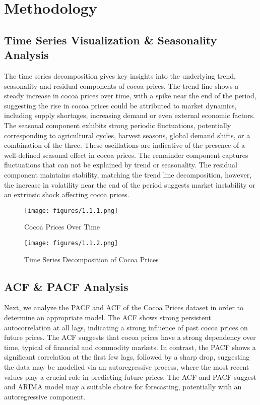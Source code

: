 
\chapter{Methodology}

    
\section{Time Series Visualization \& Seasonality Analysis}
The time series decomposition gives key insights into the underlying trend, seasonality and residual components of cocoa prices. The trend line shows a steady increase in cocoa prices over time, with a spike near the end of the period, suggesting the rise in cocoa prices could be attributed to market dynamics, including supply shortages, increasing demand or even external economic factors. The seasonal component exhibits strong periodic fluctuations, potentially corresponding to agricultural cycles, harvest seasons, global demand shifts, or a combination of the three. These oscillations are indicative of the presence of a well-defined seasonal effect in cocoa prices. The remainder component captures fluctuations that can not be explained by trend or seasonality. The residual component maintains stability, matching the trend line decomposition, however, the increase in volatility near the end of the period suggests market instability or an extrinsic shock affecting cocoa prices. \\
\begin{figure}[!ht]
    \centering
    \texttt{[image: figures/1.1.1.png]}
    \caption{Cocoa Prices Over Time}
    \label{fig:chart_a}
\end{figure}

\begin{figure}[!ht]
    \centering
    \texttt{[image: figures/1.1.2.png]}
    \caption{Time Series Decomposition of Cocoa Prices}
    \label{fig:chart_a}
\end{figure}

\section{ACF \& PACF Analysis}
Next, we analyze the PACF and ACF of the Cocoa Prices dataset in order to determine an appropriate model. The ACF shows strong persistent autocorrelation at all lags, indicating a strong influence of past cocoa prices on future prices. The ACF suggests that cocoa prices have a strong dependency over time, typical of financial and commodity markets. In contrast, the PACF shows a significant correlation at the first few lags, followed by a sharp drop, suggesting the data may be modelled via an autoregressive process, where the most recent values play a crucial role in predicting future prices. The ACF and PACF suggest and ARIMA model may a suitable choice for forecasting, potentially with an autoregressive component. 

